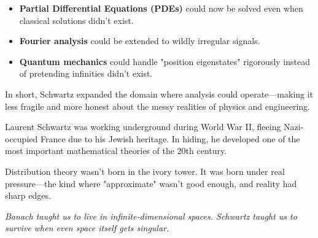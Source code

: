 \begin{itemize}
    \item \textbf{Partial Differential Equations (PDEs)} could now be solved even when classical solutions didn’t exist.
    \item \textbf{Fourier analysis} could be extended to wildly irregular signals.
    \item \textbf{Quantum mechanics} could handle "position eigenstates" rigorously instead of pretending infinities didn’t exist.
\end{itemize}

In short, Schwartz expanded the domain where analysis could operate—making it less fragile and more honest about the messy realities of physics and engineering.

\begin{tcolorbox}[title=Historical Sidebar: The Mathematician Who Outsmarted Infinity, colback=gray!5!white, colframe=black!80!white, fonttitle=\bfseries]

  Laurent Schwartz was working underground during World War II, fleeing Nazi-occupied France due to his Jewish heritage.  
  In hiding, he developed one of the most important mathematical theories of the 20th century.

  Distribution theory wasn't born in the ivory tower.  
  It was born under real pressure—the kind where "approximate" wasn’t good enough, and reality had sharp edges.
  
\end{tcolorbox}

\vspace{1em}

\begin{center}
\textit{Banach taught us to live in infinite-dimensional spaces.  
Schwartz taught us to survive when even space itself gets singular.}
\end{center}
